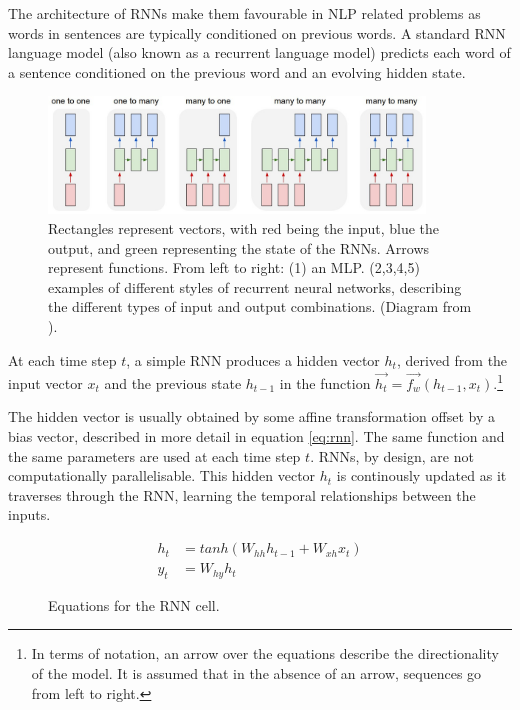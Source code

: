 \documentclass[12pt,twoside]{report}
\begin{document}
The architecture of RNNs make them favourable in NLP related problems as words in sentences are typically conditioned on previous words. A standard RNN language model (also known as a recurrent language model) predicts each word of a sentence conditioned on the previous word and an evolving hidden state.

\begin{figure}[!ht]
	\centering
	\includegraphics[width=100mm]{diagrams/rnn.jpeg}
	\caption{Rectangles represent vectors, with red being the input, blue the output, and green representing the state of the RNNs. Arrows represent  functions. From left to right: (1) an MLP. (2,3,4,5)  examples of different styles of recurrent neural networks, describing the different types of input and output combinations. (Diagram from \cite{karpathy_unreasonable_2015}). \label{rnn_shapes}} 
\end{figure}

At each time step $t$, a simple RNN produces a hidden vector $h_t$, derived from the input vector $x_t$ and the previous state $h_{t-1}$ in the function $\overrightarrow{h_t} = \overrightarrow{f_w}(h_{t-1}, x_t)$.\footnote{In terms of notation, an arrow over the equations describe the directionality of the model. It is assumed that in the absence of an arrow, sequences go from left to right.}

The hidden vector is usually obtained by some affine transformation offset by a bias vector, described in more detail in equation \ref{eq:rnn}. The same function and the same parameters are used at each time step $t$. RNNs, by design, are not computationally parallelisable. This hidden vector $h_t$ is continously updated as it traverses through the RNN, learning the temporal relationships between the inputs.

\begin{figure}[!ht]
\begin{equation}
\label{eq:rnn}
\begin{aligned}
	h_t &= tanh(W_{hh}h_{t-1}+W_{xh}x_t)
\\
y_t &= W_{hy}h_t
\end{aligned}
\end{equation}
\captionsetup{labelformat=empty}
\caption{Equations for the RNN cell.}
\end{figure}
\end{document}
